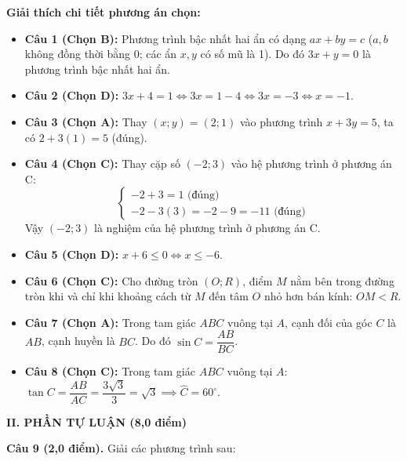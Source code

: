\documentclass[12pt,a4paper]{article}
\begin{document}
\noindent\textbf{Giải thích chi tiết phương án chọn:}
\begin{itemize}[leftmargin=18pt, itemsep=3.5pt, parsep=0pt]
  \item \textbf{Câu 1 (Chọn B):} Phương trình bậc nhất hai ẩn có dạng $ax + by = c$ ($a, b$ không đồng thời bằng 0; các ẩn $x, y$ có số mũ là 1). Do đó $3x + y = 0$ là phương trình bậc nhất hai ẩn.
  \item \textbf{Câu 2 (Chọn D):} $3x + 4 = 1 \iff 3x = 1 - 4 \iff 3x = -3 \iff x = -1$.
  \item \textbf{Câu 3 (Chọn A):} Thay $(x; y) = (2; 1)$ vào phương trình $x + 3y = 5$, ta có $2 + 3(1) = 5$ (đúng).
  \item \textbf{Câu 4 (Chọn C):} Thay cặp số $(-2; 3)$ vào hệ phương trình ở phương án C:
  \[
    \begin{cases}
      -2 + 3 = 1 \text{ (đúng)} \\
      -2 - 3(3) = -2 - 9 = -11 \text{ (đúng)}
    \end{cases}
  \]
  Vậy $(-2; 3)$ là nghiệm của hệ phương trình ở phương án C.
  \item \textbf{Câu 5 (Chọn D):} $x + 6 \le 0 \iff x \le -6$.
  \item \textbf{Câu 6 (Chọn C):} Cho đường tròn $(O; R)$, điểm $M$ nằm bên trong đường tròn khi và chỉ khi khoảng cách từ $M$ đến tâm $O$ nhỏ hơn bán kính: $OM < R$.
  \item \textbf{Câu 7 (Chọn A):} Trong tam giác $ABC$ vuông tại $A$, cạnh đối của góc $C$ là $AB$, cạnh huyền là $BC$. Do đó $\sin C = \dfrac{AB}{BC}$.
  \item \textbf{Câu 8 (Chọn C):} Trong tam giác $ABC$ vuông tại $A$:\\
  $\tan C = \dfrac{AB}{AC} = \dfrac{3\sqrt{3}}{3} = \sqrt{3} \implies \widehat{C} = 60^\circ$.
\end{itemize}

\newpage

\noindent\textbf{\large II. PHẦN TỰ LUẬN (8,0 điểm)}

\vspace{1.5mm}
\noindent\textbf{Câu 9 (2,0 điểm).} Giải các phương trình sau:
\end{document}

